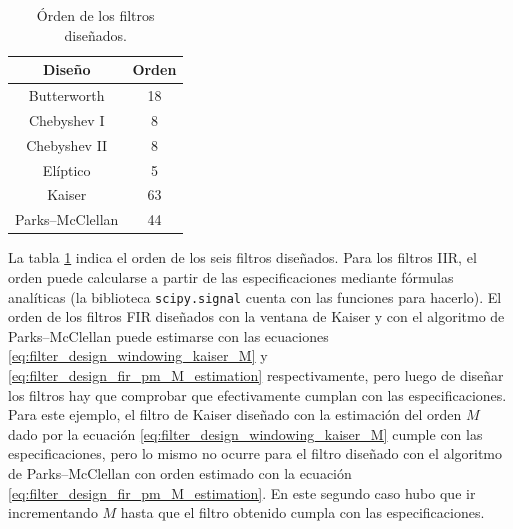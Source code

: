 \documentclass[a4paper]{report}
\begin{document}
\begin{table}[ht!]
\begin{center}
\begin{tabular}{cc}\hline
Diseño            & Orden  \\ \hline
Butterworth       & 18     \\ 
Chebyshev I       &  8     \\ 
Chebyshev II      &  8     \\ 
Elíptico          &  5     \\ 
Kaiser            & 63     \\ 
Parks--McClellan  & 44     \\ \hline
\end{tabular}
\end{center}\caption{Órden de los filtros diseñados.}\label{tab:filter_design_upsampling_filter_sec_07_10_orders}
\end{table} 
La tabla \ref{tab:filter_design_upsampling_filter_sec_07_10_orders} indica el orden de los seis filtros diseñados. Para los filtros IIR, el orden puede calcularse a partir de las especificaciones mediante fórmulas analíticas (la biblioteca \texttt{scipy.signal} cuenta con las funciones para hacerlo). El orden de los filtros FIR diseñados con la ventana de Kaiser y con el algoritmo de Parks--McClellan puede estimarse con las ecuaciones \ref{eq:filter_design_windowing_kaiser_M} y \ref{eq:filter_design_fir_pm_M_estimation} respectivamente, pero luego de diseñar los filtros hay que comprobar que efectivamente cumplan con las especificaciones. Para este ejemplo, el filtro de Kaiser diseñado con la estimación del orden \(M\) dado por la ecuación \ref{eq:filter_design_windowing_kaiser_M} cumple con las especificaciones, pero lo mismo no ocurre para el filtro diseñado con el algoritmo de Parks--McClellan con orden estimado con la ecuación \ref{eq:filter_design_fir_pm_M_estimation}. En este segundo caso hubo que ir incrementando \(M\) hasta que el filtro obtenido cumpla con las especificaciones. 
\end{document}
